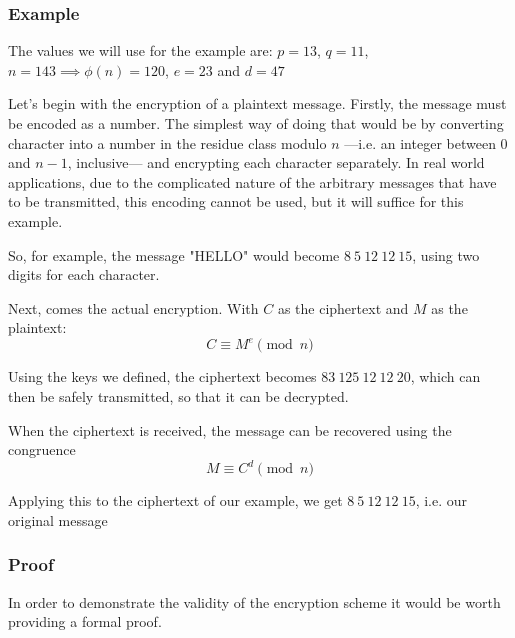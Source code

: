 \documentclass[12pt, titlepage]{article}
\begin{document}
\subsubsection{Example}

The values we will use for the example are: $p=13$, $q=11$, $n=143 \implies \phi (n) =
120$, $e = 23$ and $d = 47$

Let's begin with the encryption of a plaintext message. Firstly, the message must be encoded
as a number. The simplest way of doing that would be by converting character into a number
in the residue class modulo $n$ ---i.e. an integer between $0$ and $n-1$, inclusive--- and
encrypting each character separately.  In real world applications, due to the complicated
nature of the arbitrary messages that have to be transmitted, this encoding cannot be used,
but it will suffice for this example.

So, for example, the message "HELLO" would become $8\ 5\ 12\ 12\ 15$, using two digits for
each character.

Next, comes the actual encryption. With $C$ as the ciphertext and $M$ as the plaintext:
\begin{equation*}
    C \equiv M^{e} \pmod{n}
\end{equation*}

Using the keys we defined, the ciphertext becomes $83\ 125\ 12\ 12\ 20$, which can then be
safely transmitted, so that it can be decrypted.   

When the ciphertext is received, the message can be recovered using the congruence
\begin{equation*}
    M \equiv C^{d} \pmod{n}
\end{equation*}

Applying this to the ciphertext of our example, we get $8\ 5\ 12\ 12\ 15$, i.e. our original
message

\subsubsection{Proof}

In order to demonstrate the validity of the encryption scheme it would be worth providing a
formal proof. \autocite{so_rsa_proof}
\end{document}
